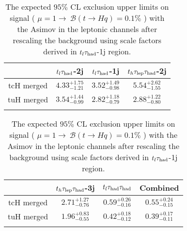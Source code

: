 \begin{table}
\centering
\begin{tabular}{cccc} \toprule\toprule
 & $t_l\tau_\text{had}$-2j & $t_l\tau_\text{had}$-1j & $t_h\tau_\text{lep}{}\tau_\text{had}$-2j\\\midrule
tcH merged & $4.33^{+1.75}_{-1.21}$ & $3.52^{+1.49}_{-0.98}$ & $5.54^{+2.62}_{-1.55}$\\
tuH merged & $3.54^{+1.44}_{-0.99}$ & $2.82^{+1.18}_{-0.79}$ & $2.88^{+1.22}_{-0.80}$\\
\bottomrule\bottomrule\\
\end{tabular}
\begin{tabular}{cccc} \toprule\toprule
 & $t_h\tau_\text{lep}{}\tau_\text{had}$-3j & $t_l\tau_\text{had}{}\tau_\text{had}$ & Combined\\\midrule
tcH merged & $2.71^{+1.27}_{-0.76}$ & $0.59^{+0.26}_{-0.16}$ & $0.55^{+0.24}_{-0.15}$\\
tuH merged & $1.96^{+0.83}_{-0.55}$ & $0.42^{+0.18}_{-0.12}$ & $0.39^{+0.17}_{-0.11}$\\
\bottomrule\bottomrule\\
\end{tabular}
\caption{The expected $95\%$ CL exclusion upper limits on signal ( $\mu=1\to~\mathcal{B}(t\to Hq)=0.1\%$ ) with the Asimov in the leptonic channels after rescaling the background using scale factors derived in  $t_l\tau_\text{had}$-1j region.} 
\label{tab:tthML_rescaled_limit_1j}
\end{table}


